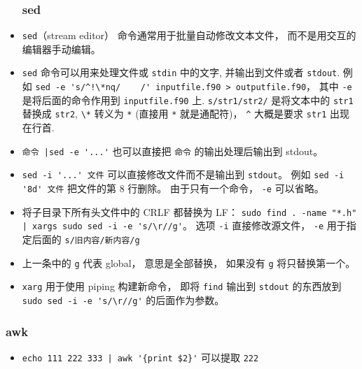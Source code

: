 \begin{itemize}
\subsubsection{sed}
\item \verb|sed|（stream editor） 命令通常用于批量自动修改文本文件， 而不是用交互的编辑器手动编辑。
\item \verb`sed` 命令可以用来处理文件或 \verb|stdin| 中的文字, 并输出到文件或者 \verb|stdout|. 例如
\verb|sed -e 's/^!\*nq/    /' inputfile.f90 > outputfile.f90|， 其中 \verb`-e` 是将后面的命令作用到 \verb`inputfile.f90` 上. \verb`s/str1/str2/` 是将文本中的 \verb`str1` 替换成 \verb`str2`, \verb`\*` 转义为 \verb`*` (直接用 \verb`*` 就是通配符)， \verb`^` 大概是要求 \verb`str1` 出现在行首.
\item \verb`命令 |sed -e '...'` 也可以直接把 \verb|命令| 的输出处理后输出到 stdout。
\item \verb|sed -i '...' 文件| 可以直接修改文件而不是输出到 \verb|stdout|。 例如 \verb|sed -i '8d' 文件| 把文件的第 8 行删除。 由于只有一个命令， \verb|-e| 可以省略。
\item 将子目录下所有头文件中的 CRLF 都替换为 LF： \verb`sudo find . -name "*.h" | xargs sudo sed -i -e 's/\r//g'`。 选项 \verb`-i` 直接修改源文件， \verb`-e` 用于指定后面的 \verb`s/旧内容/新内容/g`
\item 上一条中的 \verb|g| 代表 global， 意思是全部替换， 如果没有 \verb|g| 将只替换第一个。
\item \verb`xarg` 用于使用 piping 构建新命令， 即将 \verb|find| 输出到 \verb|stdout| 的东西放到 \verb`sudo sed -i -e 's/\r//g'` 的后面作为参数。
\end{itemize}

\subsubsection{awk}
\begin{itemize}
\item \verb`echo 111 222 333 | awk '{print $2}'` 可以提取 \verb|222|
\end{itemize}

